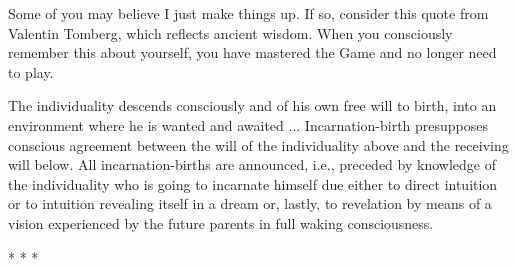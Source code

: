 Some of you may believe I just make things up. If so, consider this quote from Valentin Tomberg, which reflects ancient wisdom. When you consciously remember this about yourself, you have mastered the Game and no longer need to play.

\begin{quotex}
The individuality descends consciously and of his own free will to birth, into an environment where he is wanted and awaited ... Incarnation-birth presupposes conscious agreement between the will of the individuality above and the receiving will below. All incarnation-births are announced, i.e., preceded by knowledge of the individuality who is going to incarnate himself due either to direct intuition or to intuition revealing itself in a dream or, lastly, to revelation by means of a vision experienced by the future parents in full waking consciousness.
\end{quotex}




\begin{center}* * *\end{center}

